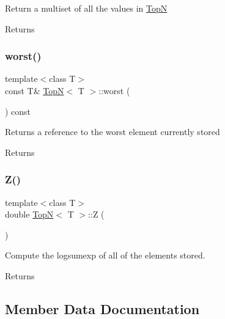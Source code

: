 Return a multiset of all the values in \hyperlink{class_top_n}{TopN} \begin{DoxyReturn}{Returns}

\end{DoxyReturn}
\mbox{\label{class_top_n_a29d25f1254f2c2e31612004593afa498}} 
\subsubsection{\texorpdfstring{worst()}{worst()}}
{\footnotesize\ttfamily template$<$class T$>$ \\
const T\& \hyperlink{class_top_n}{TopN}$<$ T $>$\+::worst (\begin{DoxyParamCaption}{ }\end{DoxyParamCaption}) const\hspace{0.3cm}{\ttfamily [inline]}}

Returns a reference to the worst element currently stored \begin{DoxyReturn}{Returns}

\end{DoxyReturn}
\mbox{\label{class_top_n_a94191264b36318ce50e32c36018ef104}} 
\subsubsection{\texorpdfstring{Z()}{Z()}}
{\footnotesize\ttfamily template$<$class T$>$ \\
double \hyperlink{class_top_n}{TopN}$<$ T $>$\+::Z (\begin{DoxyParamCaption}{ }\end{DoxyParamCaption})\hspace{0.3cm}{\ttfamily [inline]}}

Compute the logsumexp of all of the elements stored. \begin{DoxyReturn}{Returns}

\end{DoxyReturn}


\subsection{Member Data Documentation}
\mbox{\label{class_top_n_a0b10798cc83ac3b20bfe0dd5f1d45e86}} 

